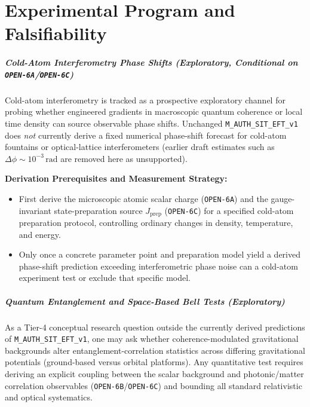 \part{Experimental Program and Falsifiability}

\subsubsection{Cold-Atom Interferometry Phase Shifts (Exploratory, Conditional on \texttt{OPEN-6A}/\texttt{OPEN-6C})}

Cold-atom interferometry is tracked as a prospective exploratory channel for probing whether engineered gradients in macroscopic quantum coherence or local time density can source observable phase shifts. Unchanged \texttt{M\_AUTH\_SIT\_EFT\_v1} does \emph{not} currently derive a fixed numerical phase-shift forecast for cold-atom fountains or optical-lattice interferometers (earlier draft estimates such as $\Delta\phi \sim 10^{-3}\,\mathrm{rad}$ are removed here as unsupported).

\textbf{Derivation Prerequisites and Measurement Strategy:}
\begin{itemize}
    \item First derive the microscopic atomic scalar charge (\texttt{OPEN-6A}) and the gauge-invariant state-preparation source $J_{\mathrm{prep}}$ (\texttt{OPEN-6C}) for a specified cold-atom preparation protocol, controlling ordinary changes in density, temperature, and energy.
    \item Only once a concrete parameter point and preparation model yield a derived phase-shift prediction exceeding interferometric phase noise can a cold-atom experiment test or exclude that specific model.
\end{itemize}

\subsubsection{Quantum Entanglement and Space-Based Bell Tests (Exploratory)}

As a Tier-4 conceptual research question outside the currently derived predictions of \texttt{M\_AUTH\_SIT\_EFT\_v1}, one may ask whether coherence-modulated gravitational backgrounds alter entanglement-correlation statistics across differing gravitational potentials (ground-based versus orbital platforms). Any quantitative test requires deriving an explicit coupling between the scalar background and photonic/matter correlation observables (\texttt{OPEN-6B}/\texttt{OPEN-6C}) and bounding all standard relativistic and optical systematics.

